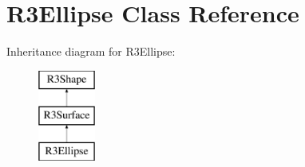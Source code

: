 \hypertarget{class_r3_ellipse}{}\section{R3\+Ellipse Class Reference}
\label{class_r3_ellipse}
Inheritance diagram for R3\+Ellipse\+:\begin{figure}[H]
\begin{center}
\leavevmode
\includegraphics[height=3.000000cm]{class_r3_ellipse}
\end{center}
\end{figure}
